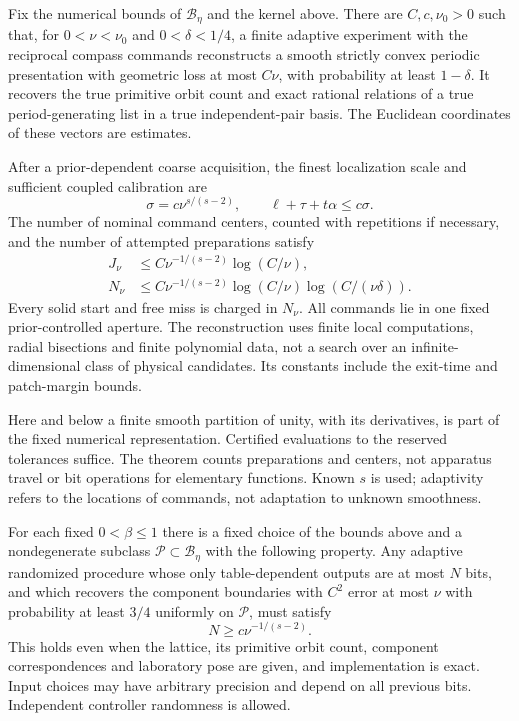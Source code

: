 \begin{theorem}\label{thm:adaptive}
Fix the numerical bounds of $\mathcal B_\eta$ and the kernel above.
There are $C,c,\nu_0>0$ such that, for $0<\nu<\nu_0$ and
$0<\delta<1/4$, a finite adaptive experiment with the reciprocal
compass commands reconstructs a smooth strictly convex periodic
presentation with geometric loss at most $C\nu$, with probability
at least $1-\delta$. It recovers the true primitive orbit count and
exact rational relations of a true period-generating list in a true
independent-pair basis. The Euclidean coordinates of these vectors
are estimates.

After a prior-dependent coarse acquisition, the finest localization
scale and sufficient coupled calibration are
\begin{equation}\label{eq:precision}
 \sigma=c\nu^{s/(s-2)},\qquad \ell+\tau+t\alpha\le c\sigma.
\end{equation}
The number of nominal command centers, counted with repetitions if
necessary, and the number of attempted preparations satisfy
\begin{align}
 J_\nu&\le C\nu^{-1/(s-2)}\log(C/\nu),\label{eq:centers}\\
 N_\nu&\le C\nu^{-1/(s-2)}\log(C/\nu)
                               \log(C/(\nu\delta)).\label{eq:attempts}
\end{align}
Every solid start and free miss is charged in $N_\nu$. All commands lie
in one fixed prior-controlled aperture. The reconstruction uses finite
local computations, radial bisections and finite polynomial data, not
a search over an infinite-dimensional class of physical candidates.
Its constants include the exit-time and patch-margin bounds.
\end{theorem}

Here and below a finite smooth partition of unity, with its derivatives,
is part of the fixed numerical representation. Certified evaluations
to the reserved tolerances suffice. The theorem counts preparations
and centers, not apparatus travel or bit operations for elementary
functions. Known $s$ is used; adaptivity refers to the locations of
commands, not adaptation to unknown smoothness.

\begin{theorem}
\label{thm:lower}
For each fixed $0<\beta\le1$ there is a fixed choice of the bounds
above and a nondegenerate subclass $\mathcal P\subset\mathcal B_\eta$
with the following property. Any adaptive randomized procedure whose
only table-dependent outputs are at most $N$ bits, and which recovers
the component boundaries with $C^2$ error at most $\nu$ with probability
at least $3/4$ uniformly on $\mathcal P$, must satisfy
\begin{equation}\label{eq:lower}
                         N\ge c\nu^{-1/(s-2)}.
\end{equation}
This holds even when the lattice, its primitive orbit count, component
correspondences and laboratory pose are given, and implementation is
exact. Input choices may have arbitrary precision and depend on all
previous bits. Independent controller randomness is allowed.
\end{theorem}

